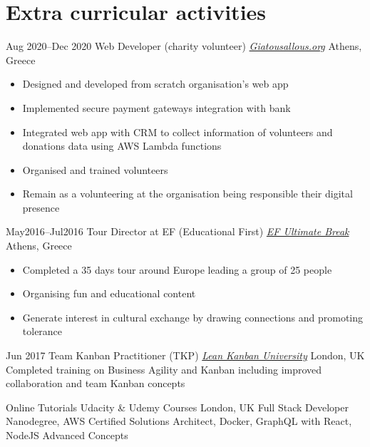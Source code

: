 \section{\normalfont Extra curricular activities}
\vspace{-.1cm}
\begin{entrylist}

\entry
{Aug 2020--Dec 2020}
{Web Developer (charity volunteer) {\normalfont \emph{\href{https://www.giatousallous.org/}{Giatousallous.org}}}}
{Athens, Greece}
\vspace{-0.6cm}
\begin{itemize}[leftmargin=.6cm]
	\item Designed and developed from scratch organisation's web app
	\item Implemented secure payment gateways integration with bank
	\item Integrated web app with CRM to collect information of volunteers and donations data using AWS Lambda functions
	\item Organised and trained volunteers
	\item Remain as a volunteering at the organisation being responsible their digital presence
\end{itemize}

\entry
{May2016–Jul2016}
{Tour Director at EF (Educational First)  {\normalfont \emph{\href{https://www.efultimatebreak.com/}{EF Ultimate Break}}}}
{Athens, Greece}
\vspace{-0.6cm}
\begin{itemize}[leftmargin=.6cm]	
	\item Completed a 35 days tour around Europe leading a group of 25 people
	\item Organising fun and educational content
	\item Generate interest in cultural exchange by drawing connections and promoting tolerance
\end{itemize}

\entry
{Jun 2017}
{Team Kanban Practitioner (TKP) {\normalfont \emph{\href{https://www.kanban.university/}{Lean Kanban University}}}} 
{London, UK} 
{Completed training on Business Agility and Kanban including improved collaboration and team Kanban concepts}

\entry
{Online Tutorials}
{Udacity \& Udemy Courses}
{London, UK} 
{Full Stack Developer Nanodegree, AWS Certified Solutions Architect, Docker, GraphQL with React, NodeJS Advanced Concepts}
\end{entrylist}